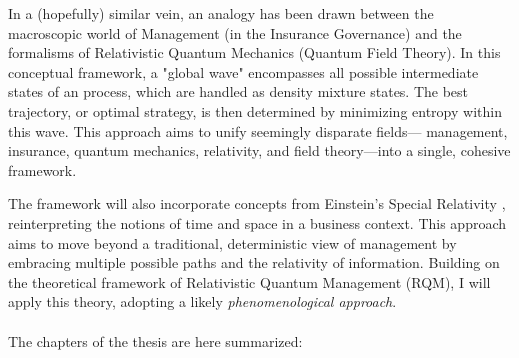 \documentclass{article}
\begin{document}
In a (hopefully) similar vein, an analogy has been drawn between the macroscopic world of Management (in the Insurance Governance) and the formalisms of Relativistic Quantum Mechanics (Quantum Field Theory). In this conceptual framework, a "global wave" encompasses all possible intermediate states of an process, which are handled as density mixture states. The best trajectory, or optimal strategy, is then determined by minimizing entropy within this wave. This approach aims to unify seemingly disparate fields— management, insurance, quantum mechanics, relativity, and field theory—into a single, cohesive framework. 

 The framework will also incorporate concepts from Einstein's Special Relativity \cite{einstein1905elektrodynamik}, reinterpreting the notions of time and space in a business context. This approach aims to move beyond a traditional, deterministic view of management by embracing multiple possible paths and the relativity of information. Building on the theoretical framework of Relativistic Quantum Management (RQM), I will apply this theory, adopting a likely \textit{phenomenological approach}.\\\\
 The chapters of the thesis are here summarized:\\
\end{document}
